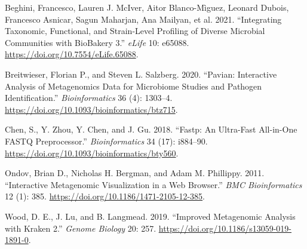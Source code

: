 \documentclass[
]{article}
\newlength{\cslhangindent}
\newlength{\cslentryspacingunit} %
\newenvironment{CSLReferences}[2] %
 {%
  \setlength{\parindent}{0pt}
  \ifodd #1
  \let\oldpar\par
  \def\par{\hangindent=\cslhangindent\oldpar}
  \fi
  \setlength{\parskip}{#2\cslentryspacingunit}
 }%
 {}
\begin{document}
\hypertarget{refs}{}
\begin{CSLReferences}{1}{0}
\leavevmode{}%
Beghini, Francesco, Lauren J. McIver, Aitor Blanco-Mìguez, Leonard
Dubois, Francesco Asnicar, Sagun Maharjan, Ana Mailyan, et al. 2021.
{``Integrating Taxonomic, Functional, and Strain-Level Profiling of
Diverse Microbial Communities with Bio{B}akery 3.''} \emph{eLife} 10:
e65088. \url{https://doi.org/10.7554/eLife.65088}.

\leavevmode{}%
Breitwieser, Florian P., and Steven L. Salzberg. 2020. {``Pavian:
Interactive Analysis of Metagenomics Data for Microbiome Studies and
Pathogen Identification.''} \emph{Bioinformatics} 36 (4): 1303--4.
\url{https://doi.org/10.1093/bioinformatics/btz715}.

\leavevmode{}%
Chen, S., Y. Zhou, Y. Chen, and J. Gu. 2018. {``Fastp: An Ultra-Fast
All-in-One {FASTQ} Preprocessor.''} \emph{Bioinformatics} 34 (17):
i884--90. \url{https://doi.org/10.1093/bioinformatics/bty560}.

\leavevmode{}%
Ondov, Brian D., Nicholas H. Bergman, and Adam M. Phillippy. 2011.
{``Interactive Metagenomic Visualization in a {Web} Browser.''}
\emph{BMC Bioinformatics} 12 (1): 385.
\url{https://doi.org/10.1186/1471-2105-12-385}.

\leavevmode{}%
Wood, D. E., J. Lu, and B. Langmead. 2019. {``Improved Metagenomic
Analysis with {Kraken} 2.''} \emph{Genome Biology} 20: 257.
\url{https://doi.org/10.1186/s13059-019-1891-0}.

\end{CSLReferences}
\end{document}
